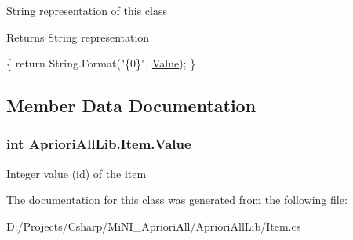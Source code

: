 String representation of this class 

\begin{DoxyReturn}{Returns}
String representation
\end{DoxyReturn}

\begin{DoxyCode}
                                          \{
            \textcolor{keywordflow}{return} String.Format(\textcolor{stringliteral}{"\{0\}"}, \hyperlink{class_apriori_all_lib_1_1_item_ab54b4b9529a99f74048264c3ed2ab6bd}{Value});
        \}
\end{DoxyCode}


\subsection{Member Data Documentation}
\hypertarget{class_apriori_all_lib_1_1_item_ab54b4b9529a99f74048264c3ed2ab6bd}{
\subsubsection[{Value}]{\setlength{\rightskip}{0pt plus 5cm}int Apriori\-All\-Lib.\-Item.\-Value}}\label{class_apriori_all_lib_1_1_item_ab54b4b9529a99f74048264c3ed2ab6bd}


Integer value (id) of the item 



The documentation for this class was generated from the following file\-:\begin{DoxyCompactItemize}
\item 
D\-:/\-Projects/\-Csharp/\-Mi\-N\-I\-\_\-\-Apriori\-All/\-Apriori\-All\-Lib/Item.\-cs\end{DoxyCompactItemize}
